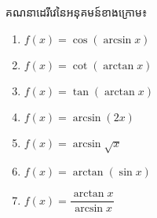 \documentclass[a4paper,12pt]{article}
\begin{document}
\begin{exercise}
	គណនាដេរីវេនៃអនុគមន៍ខាងក្រោម៖
	\begin{multicols}{2}
		\begin{enumerate}
			\item $f(x)=\cos (\arcsin x)$
			\item $f(x)=\cot (\arctan x)$
			\item $f(x)=\tan (\arctan x)$
			\item $f(x)=\arcsin (2x)$
			\item $f(x)=\arcsin \sqrt{x}$
			\item $f(x)=\arctan (\sin x)$
			\item $f(x)=\dfrac{\arctan x}{\arcsin x}$
		\end{enumerate}
	\end{multicols}
\end{exercise}
\answer
\end{document}
